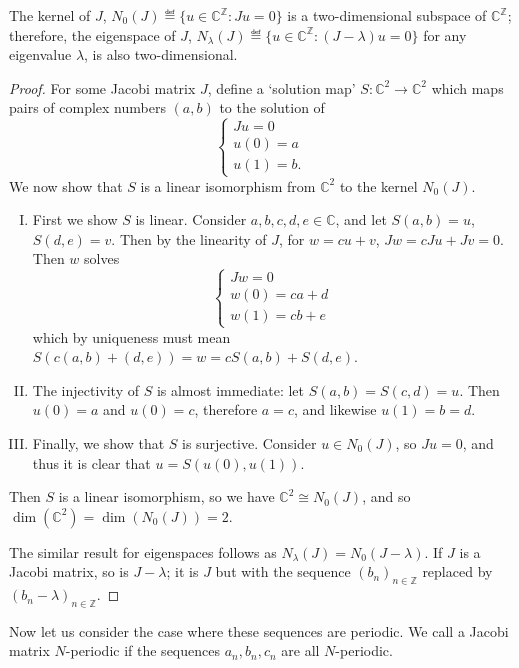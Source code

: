 \documentclass[../main.tex]{subfiles}
\begin{document}
\begin{proposition}\label{thm:2efde-ker-dim}
The kernel of $J$, $N_0(J) \eqdef \{u \in \mathbb{C}^\mathbb{Z} : Ju = 0\}$ is a two-dimensional subspace of $\mathbb{C}^\mathbb{Z}$; therefore, the eigenspace of $J$, $N_\lambda(J) \eqdef \{u \in \mathbb{C}^\mathbb{Z} : (J - \lambda)u = 0\}$ for any eigenvalue $\lambda$, is also two-dimensional.
\end{proposition}
\begin{proof}
For some Jacobi matrix $J$, define a `solution map' $S: \mathbb{C}^2 \rightarrow \mathbb{C}^2$ which maps pairs of complex numbers $(a, b)$ to the solution of
$$
\begin{cases}
Ju = 0\\
u(0) = a\\
u(1) = b.
\end{cases}
$$
We now show that $S$ is a linear isomorphism from $\mathbb{C}^2$ to the kernel $N_0 (J)$.
\begin{enumerate}[I.]
\item First we show $S$ is linear. Consider $a, b, c, d, e \in \mathbb{C}$, and let $S(a, b) = u$, $S(d, e) = v$.
Then by the linearity of $J$, for $w = cu + v$, $Jw = cJu + Jv = 0$. Then $w$ solves
$$
\begin{cases}
Jw = 0\\
w(0) = ca + d\\
w(1) = cb + e
\end{cases}
$$
which by uniqueness must mean $S(c(a, b) + (d, e)) = w = cS(a, b) + S(d, e)$.

\item The injectivity of $S$ is almost immediate: let $S(a, b) = S(c, d) = u$. Then $u(0) = a$ and $u(0) = c$, therefore $a = c$, and likewise $u(1) = b = d$.

\item Finally, we show that $S$ is surjective. Consider $u \in N_0 (J)$, so $Ju = 0$, and thus it is clear that $u = S(u(0), u(1)).$
\end{enumerate}
Then $S$ is a linear isomorphism, so we have $\mathbb{C}^2 \cong N_0 (J)$, and so $\dim(\mathbb{C}^2) = \dim(N_0 (J)) = 2$.

The similar result for eigenspaces follows as $N_\lambda (J) = N_0 (J - \lambda)$. If $J$ is a Jacobi matrix, so is $J - \lambda$; it is $J$ but with the sequence $(b_n)_{n \in \mathbb{Z}}$ replaced by $(b_n - \lambda)_{n \in \mathbb{Z}}$.
\end{proof}

Now let us consider the case where these sequences are periodic. We call a Jacobi matrix $N$-periodic if the sequences $a_n, b_n, c_n$ are all $N$-periodic.
\end{document}
